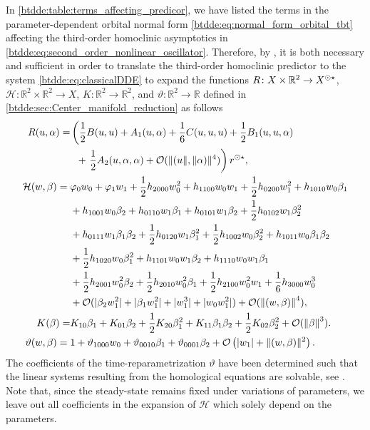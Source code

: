 In \cref{btdde:table:terms_affecting_predicor}, we have listed the terms in the
parameter-dependent orbital normal form
\cref{btdde:eq:normal_form_orbital_tbt} affecting the third-order homoclinic
asymptotics in \cref{btdde:eq:second_order_nonlinear_oscillator}. Therefore, by
\cite[Theorem 1]{Bosschaert@Interplay}, it is both necessary and sufficient in
order to translate the third-order homoclinic predictor to the system
\cref{btdde:eq:classicalDDE} to expand the functions $R \colon X \times \mathbb R^2 \rightarrow X^{\odot\star}$, 
$\mathcal{H} \colon \mathbb R^2 \times \mathbb R^2 \rightarrow X$, $K \colon
\mathbb R^2 \rightarrow \mathbb R^2$, and $\vartheta \colon \mathbb R^2
\rightarrow \mathbb R$ defined in \cref{btdde:sec:Center_manifold_reduction} as
follows
%
\begin{align}
R(u,\alpha) =& \label{btdde:eq:R_expansion_TBT}
    \left(\frac{1}{2} B(u,u) + A_1(u,\alpha) + \frac{1}{6} C(u,u,u) + \frac{1}{2} B_1(u,u,\alpha) \right. \\
    &\phantom{\Bigl(}+ \left. \frac{1}{2} A_2(u,\alpha,\alpha) 
    + \mathcal O(\|(u\|,\|\alpha)\|^4) \right) r^{\odot\star} , \nonumber \\
        \mathcal H(w,\beta) = {}& \label{btdde:eq:h_expansion-TBT}
        \varphi_0 w_0 + \varphi_1 w_1 + \frac{1}{2}h_{2000}w_0^2 + h_{1100}w_0w_1 + \frac{1}{2}h_{0200}w_1^2 + h_{1010}w_0\beta_1 \\
    & +h_{1001}w_0\beta_2 + h_{0110}w_1\beta_1 + h_{0101}w_1\beta_2 + \frac{1}{2}h_{0102}w_1\beta_2^2 \nonumber \\
    & +h_{0111}w_1\beta_1\beta_2 + \frac{1}{2}h_{0120}w_1\beta_1^2 + \frac{1}{2}h_{1002}w_0\beta_2^2 + h_{1011}w_0\beta_1\beta_2 \nonumber \\
    & +\frac{1}{2}h_{1020}w_0\beta_1^2 + h_{1101}w_0w_1\beta_2 + h_{1110}w_0w_1\beta_1\nonumber \\
    & +\frac{1}{2}h_{2001}w_0^2\beta_2 + \frac{1}{2}h_{2010}w_0^2\beta_1 + \frac{1}{2}h_{2100}w_0^2w_1 + \frac{1}{6}h_{3000}w_0^3 \nonumber \\
    & +\mathcal{O}(|\beta_2w_1^2| + |\beta_1w_1^2| + |w_1^3| + |w_0w_1^2|) + \mathcal{O}(\left\Vert (w,\beta)\right\Vert ^4), \nonumber\\
K(\beta) =& K_{10}\beta_1 + K_{01}\beta_2 + 
            \frac{1}{2}K_{20}\beta_1^2 + K_{11}\beta_1\beta_2 + \frac{1}{2}K_{02}\beta_2^2
             +\mathcal{O}(\left\Vert \beta\right\Vert ^3).\label{btdde:eq:K_expansion_TBT} \\
\vartheta(w,\beta) = {}& \label{btdde:eq:theta_expansion_TBT}
        1 + \vartheta_{1000}w_0 + \vartheta_{0010} \beta_1 + \vartheta_{0001} \beta_2 
        + \mathcal O\left(|w_1| + \|(w,\beta)\|^2\right).
\end{align}
The coefficients of the time-reparametrization $\vartheta$ have been determined
such that the linear systems resulting from the homological equations are
solvable, see \cite[Remark 2.2]{Bosschaert@Interplay}. Note that, since the
steady-state remains fixed under variations of parameters, we leave
out all coefficients in the expansion of $\mathcal{H}$ which solely depend on
the parameters.

